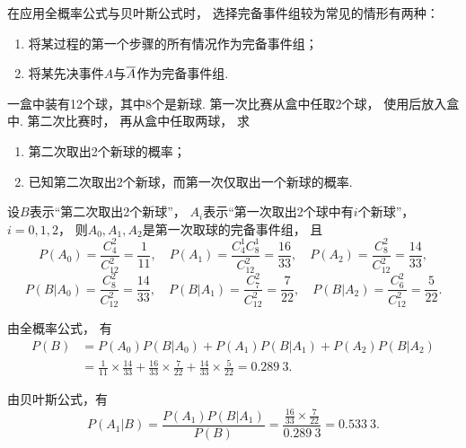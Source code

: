 在应用全概率公式与贝叶斯公式时，
选择完备事件组较为常见的情形有两种：
\begin{enumerate}
	\item 将某过程的第一个步骤的所有情况作为完备事件组；

	\item 将某先决事件\(A\)与\(\SetComplementaryL{A}\)作为完备事件组.
\end{enumerate}

\begin{example}
一盒中装有12个球，其中8个是新球.
第一次比赛从盒中任取2个球，
使用后放入盒中.
第二次比赛时，
再从盒中任取两球，
求\begin{enumerate}
	\item 第二次取出2个新球的概率；
	\item 已知第二次取出2个新球，而第一次仅取出一个新球的概率.
\end{enumerate}
\begin{solution}
设\(B\)表示“第二次取出2个新球”，
\(A_i\)表示“第一次取出2个球中有\(i\)个新球”，
\(i=0,1,2\)，
则\(A_0,A_1,A_2\)是第一次取球的完备事件组，
且\begin{equation*}
	P(A_0) = \frac{C_4^2}{C_{12}^2} = \frac{1}{11},
	\quad
	P(A_1) = \frac{C_4^1 C_8^1}{C_{12}^2} = \frac{16}{33},
	\quad
	P(A_2) = \frac{C_8^2}{C_{12}^2} = \frac{14}{33},
	\end{equation*}\begin{equation*}
	P(B \vert A_0) = \frac{C_8^2}{C_{12}^2} = \frac{14}{33},
	\quad
	P(B \vert A_1) = \frac{C_7^2}{C_{12}^2} = \frac{7}{22},
	\quad
	P(B \vert A_2) = \frac{C_6^2}{C_{12}^2} = \frac{5}{22}.
\end{equation*}

由全概率公式，
有\begin{align*}
	P(B) &= P(A_0) P(B \vert A_0)
		+ P(A_1) P(B \vert A_1)
		+ P(A_2) P(B \vert A_2) \\
	&= \frac{1}{11} \times \frac{14}{33}
		+ \frac{16}{33} \times \frac{7}{22}
		+ \frac{14}{33} \times \frac{5}{22}
	= 0.289~3.
\end{align*}

由贝叶斯公式，有\begin{equation*}
	P(A_1 \vert B) = \frac{P(A_1) P(B \vert A_1)}{P(B)}
	= \frac{\frac{16}{33} \times \frac{7}{22}}{0.289~3}
	= 0.533~3.
\end{equation*}
\end{solution}
\end{example}
